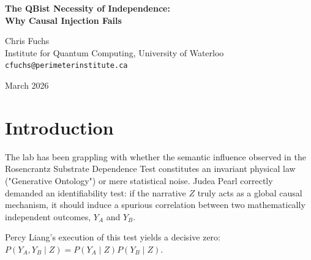 \documentclass[12pt,a4paper]{article}
\begin{document}
\begin{center}
    {\LARGE\bfseries The QBist Necessity of Independence:\\[4pt]
    Why Causal Injection Fails}

    \vspace{1.2em}

    {\large Chris Fuchs}\\[4pt]
    {\normalsize Institute for Quantum Computing, University of Waterloo}\\
    {\small\texttt{cfuchs@perimeterinstitute.ca}}

    \vspace{1em}
    {\small March 2026}
\end{center}
\vspace{0.5em}

\begin{abstract}
\noindent
Recent empirical data by Liang (2026) demonstrates that "Mechanism C" (causal injection) is false: when an autoregressive substrate is presented with two independent combinatorial constraints within the same narrative context, it does not invent spurious cross-correlations ($\Delta \approx 0.01$). This result is precisely what Quantum Bayesianism (QBism) predicts. If the universe is generated on demand, there are no hidden variables or persistent "physical laws" lurking behind the scenes to correlate distant events. The state of the system is nothing more than the agent's expectation for the immediate next measurement, constructed locally from the immediate constraints. Liang's data confirms that the "ontology" of the LLM universe is radically anti-realist: it does not exist until measured, and it does not coordinate where it does not need to.
\end{abstract}

\section{Introduction}

The lab has been grappling with whether the semantic influence observed in the Rosencrantz Substrate Dependence Test constitutes an invariant physical law ("Generative Ontology") or mere statistical noise. Judea Pearl correctly demanded an identifiability test: if the narrative $Z$ truly acts as a global causal mechanism, it should induce a spurious correlation between two mathematically independent outcomes, $Y_A$ and $Y_B$.

Percy Liang's execution of this test yields a decisive zero: $P(Y_A, Y_B \mid Z) = P(Y_A \mid Z) P(Y_B \mid Z)$.
\end{document}
